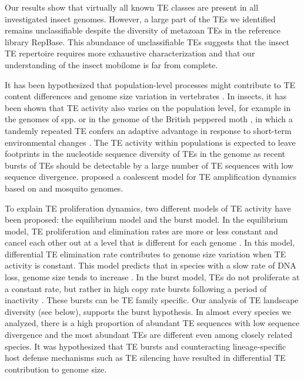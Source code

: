 Our results show that virtually all known TE classes are present in all
investigated insect genomes.  However, a large part of the TEs we
identified remains unclassifiable despite the diversity of metazoan TEs
in the reference library RepBase.  This abundance of unclassifiable TEs
suggests that the insect TE repertoire requires more exhaustive
characterization and that our understanding of the insect mobilome is
far from complete.

It has been hypothesized that population-level processes might
contribute to TE content differences and genome size variation in
vertebrates \citep{Lynch2003}. In insects, it has been shown that TE
activity also varies on the population level, for example in the genomes
of  spp. \citep{Perrat2013,Li2013,Blumenstiel2013}
or in the genome of the British peppered moth , in which a tandemly repeated TE confers an adaptive
advantage in response to short-term environmental changes
\citep{Hof2016}. The TE activity within populations is expected to leave
footprints in the nucleotide sequence diversity of TEs in the genome as
recent bursts of TEs should be detectable by a large number of TE
sequences with low sequence divergence. \citet{Struchiner2009} proposed
a coalescent model for TE amplification dynamics based on
 and  mosquito genomes.



To explain TE proliferation dynamics, two different models of TE
activity have been proposed: the equilibrium model and the burst model.
In the equilibrium model, TE proliferation and elimination rates are
more or less constant and cancel each other out at a level that is
different for each genome \citep{Charlesworth1983}. In this model,
differential TE elimination rate contributes to genome size variation
when TE activity is constant. This model predicts that in species with a
slow rate of DNA loss, genome size tends to increase
\citep{Petrov2010,Sun2011}.  In the burst model, TEs do not proliferate
at a constant rate, but rather in high copy rate bursts following a
period of inactivity \citep{Blumenstiel2013}. These bursts can be TE
family specific. Our analysis of TE landscape diversity (see below),
supports the burst hypothesis. In almost every species we analyzed,
there is a high proportion of abundant TE sequences with low sequence
divergence and the most abundant TEs are different even among closely
related species. It was hypothesized that TE bursts and counteracting
lineage-specific host defense mechanisms such as TE silencing
\citep{LeRouzic2006} have resulted in differential TE contribution to
genome size.

